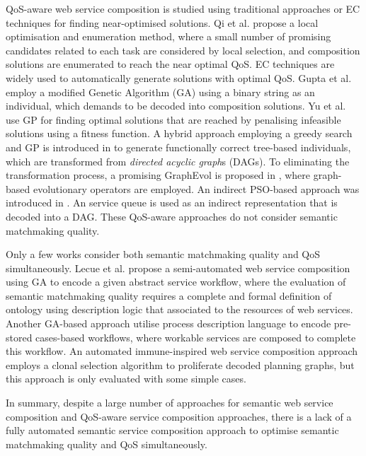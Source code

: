\documentclass{llncs}
\begin{document}
QoS-aware web service composition is studied using traditional approaches or EC techniques for finding near-optimised solutions. Qi et al. \cite{qi2010combining} propose a local optimisation and enumeration method, where a small number of promising candidates related to each task are considered by local selection, and composition solutions are enumerated to reach the near optimal QoS. EC techniques are widely used to automatically generate solutions with optimal QoS. Gupta et al. \cite{gupta2015optimization} employ a modified Genetic Algorithm (GA) using a binary string as an individual, which demands to be decoded into composition solutions. Yu et al.  \cite{yu2013adaptive} use GP for finding optimal solutions that are reached by penalising infeasible solutions using a fitness function. A hybrid approach employing a greedy search and GP is introduced in \cite{ma2015hybrid} to generate functionally correct tree-based individuals, which are transformed from \emph{directed acyclic graph}s (DAGs). To eliminating the transformation process, a promising GraphEvol is proposed in \cite{da2015graphevol}, where graph-based evolutionary operators are employed. An indirect PSO-based approach was introduced in \cite{da2016particle}. An service queue is used as an indirect representation that is decoded into a DAG. These QoS-aware approaches \cite{gupta2015optimization,qi2010combining,ma2015hybrid,da2016particle,da2015graphevol,yu2013adaptive} do not consider semantic matchmaking quality.

Only a few works \cite{fanjiang2014semantic,lecue2009optimizing,pop2009immune} consider both semantic matchmaking quality and QoS simultaneously. Lecue et al. \cite{lecue2009optimizing} propose a semi-automated web service composition using GA to encode a given abstract service workflow, where the evaluation of semantic matchmaking quality requires a complete and formal definition of ontology using description logic that associated to the resources of web services. Another GA-based approach \cite{fanjiang2014semantic} utilise process description language to encode pre-stored cases-based workflows, where workable services are composed to complete this workflow. An automated immune-inspired web service composition approach \cite{pop2009immune} employs a clonal selection algorithm to proliferate decoded planning graphs, but this approach is only evaluated with some simple cases.

In summary, despite a large number of approaches for semantic web service composition and QoS-aware service composition approaches, there is a lack of a fully automated semantic service composition approach to optimise semantic matchmaking quality and QoS simultaneously. 
\vspace{-0.3cm}
\end{document}
